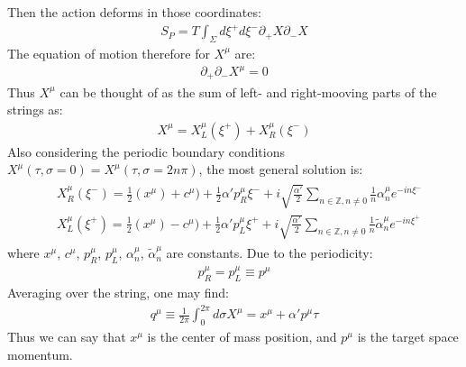 Then the action deforms in those coordinates:
\begin{align}
    S_{P} = T\int _{\Sigma} d\xi ^{+} d\xi ^{-} \partial _{+} X \partial _{-} X
\end{align}
The equation of motion therefore for $X^{\mu}$ are:
\begin{align}
    \partial _{+} \partial _{-} X^{\mu} = 0
\end{align}
Thus $X^{\mu}$ can be thought of as the sum of left- and right-mooving parts of the strings as:
\begin{align}
    X^{\mu} = X_{L} ^{\mu} (\xi ^{+}) + X_{R} ^{\mu} (\xi ^{-})
\end{align}
Also considering the periodic boundary conditions $X^{\mu} (\tau, \sigma = 0) = X^{\mu} (\tau, \sigma = 2n\pi)$, the most general solution is:
\begin{align}
    \begin{split}
        & X_{R} ^{\mu} (\xi ^{-}) = \frac{1}{2} (x^{\mu}) +c^{\mu}) + \frac{1}{2}\alpha' p_{R} ^{\mu}\xi ^{-} + i\sqrt{\frac{\alpha'}{2}}\sum_{n\in\mathbb{Z}, n\neq 0} \frac{1}{n}\alpha_{n}^{\mu} e^{-in\xi^{-}} \\
        & X_{L} ^{\mu} (\xi ^{+}) = \frac{1}{2} (x^{\mu}) -c^{\mu}) + \frac{1}{2}\alpha' p_{L} ^{\mu}\xi ^{+} + i\sqrt{\frac{\alpha'}{2}}\sum_{n\in\mathbb{Z}, n\neq 0} \frac{1}{n}\tilde{\alpha}_{n}^{\mu} e^{-in\xi^{+}}
    \end{split}
\end{align}
where $x^{\mu}$, $c^{\mu}$, $p_{R}^{\mu}$, $p_{L}^{\mu}$, $\alpha _{n} ^{\mu}$, $\tilde{\alpha} _{n} ^{\mu}$ are constants. Due to the periodicity:
\begin{align}
    p_{R}^{\mu} = p_{L}^\mu \equiv p^{\mu}
\end{align}
Averaging over the string, one may find:
\begin{align}
    q^{\mu} \equiv \frac{1}{2\pi} \int _{0} ^{2\pi} d\sigma X^{\mu} = x^{\mu} + \alpha'p^{\mu} \tau
\end{align}
Thus we can say that $x^{\mu}$ is the center of mass position, and $p^{\mu}$ is the target space momentum. 

